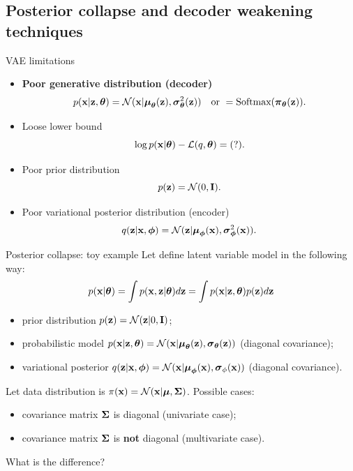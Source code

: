 \documentclass{beamer}
\begin{document}
\subsection{Posterior collapse and decoder weakening techniques}
\begin{frame}{VAE limitations}
	\begin{itemize}
		\item \textbf{Poor generative distribution (decoder)}
		\[
			p(\mathbf{x} | \mathbf{z}, \boldsymbol{\theta}) = \mathcal{N}(\mathbf{x}| \boldsymbol{\mu}_{\boldsymbol{\theta}}(\mathbf{z}), \boldsymbol{\sigma}^2_{\boldsymbol{\theta}}(\mathbf{z})) \quad \text{or } = \text{Softmax}(\boldsymbol{\pi}_{\boldsymbol{\theta}}(\mathbf{z})).
		\]
		\item Loose lower bound
		\[
			\log p(\mathbf{x} | \boldsymbol{\theta}) - \mathcal{L}(q, \boldsymbol{\theta}) = (?).
		\]
		\item Poor prior distribution
		\[
			p(\mathbf{z}) = \mathcal{N}(0, \mathbf{I}).
		\]
		\item Poor variational posterior distribution (encoder)
		\[
			q(\mathbf{z} | \mathbf{x}, \boldsymbol{\phi}) = \mathcal{N}(\mathbf{z}| \boldsymbol{\mu}_{\boldsymbol{\phi}}(\mathbf{x}), \boldsymbol{\sigma}^2_{\boldsymbol{\phi}}(\mathbf{x})).
		\]
	\end{itemize}
\end{frame}
\begin{frame}{Posterior collapse: toy example}
	Let define latent variable model in the following way:
	\[
	p(\mathbf{x} | \boldsymbol{\theta}) = \int p(\mathbf{x}, \mathbf{z} | \boldsymbol{\theta}) d \mathbf{z} = \int p(\mathbf{x} | \mathbf{z}, \boldsymbol{\theta}) p(\mathbf{z}) d \mathbf{z} 
	\]
	\begin{itemize}
		\item prior distribution $p(\mathbf{z}) = \mathcal{N}(\mathbf{z}| 0, \mathbf{I})$;
		\item probabilistic model $p(\mathbf{x} | \mathbf{z}, \boldsymbol{\theta}) = \mathcal{N}(\mathbf{x} | \boldsymbol{\mu}_{\boldsymbol{\theta}}(\mathbf{z}), \boldsymbol{\sigma}_{\boldsymbol{\theta}}(\mathbf{z}))$ (diagonal covariance);
		\item variational posterior $q(\mathbf{z} | \mathbf{x}, \boldsymbol{\phi}) =  \mathcal{N}(\mathbf{x} | \boldsymbol{\mu}_{\boldsymbol{\phi}}(\mathbf{x}), \boldsymbol{\sigma}_{\phi}(\mathbf{x}))$  (diagonal covariance).
	\end{itemize}
	
	Let data distribution is $\pi(\mathbf{x}) = \mathcal{N}(\mathbf{x} | \boldsymbol{\mu}, \boldsymbol{\Sigma})$. Possible cases:
	\begin{itemize}
		\item covariance matrix $\boldsymbol{\Sigma}$ is diagonal (univariate case);
		\item covariance matrix $\boldsymbol{\Sigma}$ is \textbf{not} diagonal (multivariate case).
	\end{itemize}
	What is the difference?
\end{frame}
\end{document}
